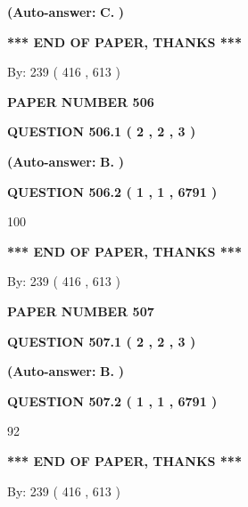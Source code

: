 \documentclass{ctexart}
\begin{document}
 
{\textbf{(Auto-answer:}}
{\textbf{\large{
C.}}}
{\textbf{)}}
 
 
   
   
   
   
\vspace{1.0in} 
{\textbf{\large{ *** END OF PAPER, THANKS *** }}} 
   
   
\hspace{1.0in} By: 
 239 ( 416 ,  613 )
   
   
   
   
\newpage 
\setcounter{page}{ 
   506001 } 
   
   
 {\textbf{ \Large{ PAPER NUMBER  506  }}}
   
   
   
   
  
  
{\textbf{\large{QUESTION
506.1 
 ( 2 , 2 , 3 )
}}}
 
 
{\textbf{(Auto-answer:}}
{\textbf{\large{
B.}}}
{\textbf{)}}
 
 
  
  
{\textbf{\large{QUESTION
506.2 
 ( 1 , 1 , 6791 )
}}}

100
   
   
   
   
\vspace{1.0in} 
{\textbf{\large{ *** END OF PAPER, THANKS *** }}} 
   
   
\hspace{1.0in} By: 
 239 ( 416 ,  613 )
   
   
   
   
\newpage 
\setcounter{page}{ 
   507001 } 
   
   
 {\textbf{ \Large{ PAPER NUMBER  507  }}}
   
   
   
   
  
  
{\textbf{\large{QUESTION
507.1 
 ( 2 , 2 , 3 )
}}}
 
 
{\textbf{(Auto-answer:}}
{\textbf{\large{
B.}}}
{\textbf{)}}
 
 
  
  
{\textbf{\large{QUESTION
507.2 
 ( 1 , 1 , 6791 )
}}}

92
   
   
   
   
\vspace{1.0in} 
{\textbf{\large{ *** END OF PAPER, THANKS *** }}} 
   
   
\hspace{1.0in} By: 
 239 ( 416 ,  613 )
   
   
   
\end{document}
